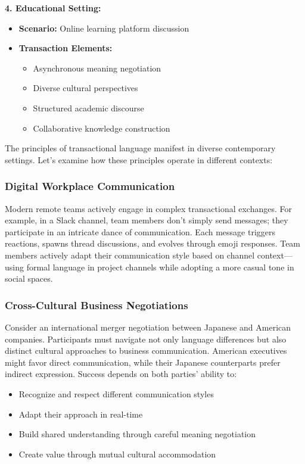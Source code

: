 \documentclass[12pt]{article}
\begin{document}
\begin{tcolorbox}[casestudybox]
\textbf{4. Educational Setting:}
\begin{itemize}
\item \textbf{Scenario:} Online learning platform discussion
\item \textbf{Transaction Elements:}
  \begin{itemize}
  \item Asynchronous meaning negotiation
  \item Diverse cultural perspectives
  \item Structured academic discourse
  \item Collaborative knowledge construction
  \end{itemize}
\end{itemize}
\end{tcolorbox}

The principles of transactional language manifest in diverse contemporary settings. Let's examine how these principles operate in different contexts:

\subsubsection{Digital Workplace Communication}
Modern remote teams actively engage in complex transactional exchanges. For example, in a Slack channel, team members don't simply send messages; they participate in an intricate dance of communication. Each message triggers reactions, spawns thread discussions, and evolves through emoji responses. Team members actively adapt their communication style based on channel context---using formal language in project channels while adopting a more casual tone in social spaces.

\subsubsection{Cross-Cultural Business Negotiations}
Consider an international merger negotiation between Japanese and American companies. Participants must navigate not only language differences but also distinct cultural approaches to business communication. American executives might favor direct communication, while their Japanese counterparts prefer indirect expression. Success depends on both parties' ability to:
\begin{itemize}
\item Recognize and respect different communication styles
\item Adapt their approach in real-time
\item Build shared understanding through careful meaning negotiation
\item Create value through mutual cultural accommodation
\end{itemize}
\end{document}

